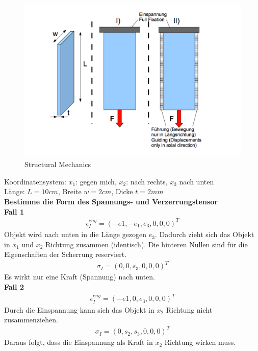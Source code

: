 \documentclass[a4paper, 10pt]{scrartcl}
\begin{document}
\begin{figure}[h]
	\begin{center}
		\includegraphics[scale=0.3]{images/structural_mechanics.pdf}
		\caption{Structural Mechanics}
		\label{fig:structuralmechanics}
	\end{center}
\end{figure}

Koordinatensystem: $x_1$: gegen mich, $x_2$: nach rechts, $x_3$ nach unten\\
Länge: $L = 10 cm$, Breite $w=2cm$, Dicke $t=2mm$\\

\textbf{Bestimme die Form des Spannungs- und Verzerrungstensor}\\

\textbf{Fall 1}\\
\begin{align}
	\epsilon_I^{eng} = (-e1, -e_1, e_3, 0, 0, 0)^T
\end{align}
Objekt wird nach unten in die Länge gezogen $e_3$. Dadurch zieht sich
das Objekt in $x_1$ und $x_2$ Richtung zusammen (identisch). Die hinteren
Nullen sind für die Eigenschaften der Scherrung reserviert.\\
\begin{align}
	\sigma_I = (0,0,s_3,0,0,0)^T
\end{align}
Es wirkt nur eine Kraft (Spannung) nach unten.\\

\textbf{Fall 2}\\
\begin{align}
	\epsilon_I^{eng} = (-e1, 0, e_3, 0, 0, 0)^T
\end{align}
Durch die Einspannung kann sich das Objekt in $x_2$ Richtung nicht
zusammenziehen.
\begin{align}
	\sigma_I = (0,s_2,s_3,0,0,0)^T
\end{align}
Daraus folgt, dass die Einspannung als Kraft in $x_2$ Richtung wirken muss.\\
\end{document}
